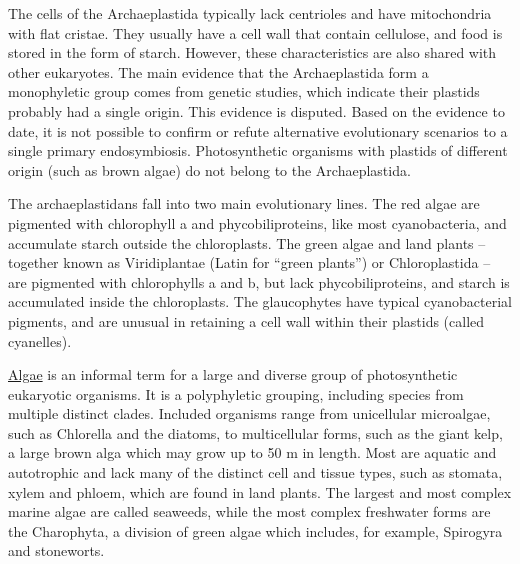 The cells of the Archaeplastida typically lack centrioles and have mitochondria with flat cristae. They usually have a cell wall that contain cellulose, and food is stored in the form of starch. However, these characteristics are also shared with other eukaryotes. The main evidence that the Archaeplastida form a monophyletic group comes from genetic studies, which indicate their plastids probably had a single origin. This evidence is disputed. Based on the evidence to date, it is not possible to confirm or refute alternative evolutionary scenarios to a single primary endosymbiosis. Photosynthetic organisms with plastids of different origin (such as brown algae) do not belong to the Archaeplastida.

The archaeplastidans fall into two main evolutionary lines. The red algae are pigmented with chlorophyll a and phycobiliproteins, like most cyanobacteria, and accumulate starch outside the chloroplasts. The green algae and land plants -- together known as Viridiplantae (Latin for ``green plants'') or Chloroplastida -- are pigmented with chlorophylls a and b, but lack phycobiliproteins, and starch is accumulated inside the chloroplasts. The glaucophytes have typical cyanobacterial pigments, and are unusual in retaining a cell wall within their plastids (called cyanelles).

\href{https://en.wikipedia.org/wiki/Algae}{Algae} is an informal term for a large and diverse group of photosynthetic eukaryotic organisms. It is a polyphyletic grouping, including species from multiple distinct clades. Included organisms range from unicellular microalgae, such as Chlorella and the diatoms, to multicellular forms, such as the giant kelp, a large brown alga which may grow up to 50 m in length. Most are aquatic and autotrophic and lack many of the distinct cell and tissue types, such as stomata, xylem and phloem, which are found in land plants. The largest and most complex marine algae are called seaweeds, while the most complex freshwater forms are the Charophyta, a division of green algae which includes, for example, Spirogyra and stoneworts.



